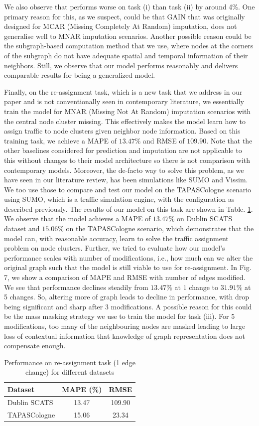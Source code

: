We also observe that \name performs worse on task (i) than task (ii) by around 4\%. One primary reason for this, as we suspect, could be that GAIN that was originally designed for MCAR (Missing Completely At Random) imputation, does not generalise well to MNAR imputation scenarios. Another possible reason could be the subgraph-based computation method that we use, where nodes at the corners of the subgraph do not have adequate spatial and temporal information of their neighbors. Still, we observe that our model performs reasonably and delivers comparable results for being a generalized model.

Finally, on the re-assignment task, which is a new task that we address in our paper and is not conventionally seen in contemporary literature, we essentially train the model for MNAR (Missing Not At Random) imputation scenarios with the central node cluster missing. This effectively makes the model learn how to assign traffic to node clusters given neighbor node information. Based on this training task, we achieve a MAPE of $13.47\%$ and RMSE of $109.90$. Note that the other baselines considered for prediction and imputation are not applicable to this without changes to their model architecture so there is not comparison with contemporary models. Moreover, the de-facto way to solve this problem, as we have seen in our literature review, has been simulations like SUMO\cite{sumo} and Vissim\cite{vissim}. We too use those to compare and test our model on the TAPASCologne scenario using SUMO, which is a traffic simulation engine, with the configuration as described previously. The results of our model on this task are shown in Table. \ref{reassign_table}. We observe that the model achieves a MAPE of $13.47\%$ on Dublin SCATS dataset and $15.06\%$ on the TAPASCologne scenario, which demonstrates that the model can, with reasonable accuracy, learn to solve the traffic assignment problem on node clusters. Further, we tried to evaluate how our model's performance scales with number of modifications, i.e., how much can we alter the original graph such that the model is still viable to use for re-assignment. In Fig. 7, we show a comparison of MAPE and RMSE with number of edges modified. We see that performance declines steadily from $13.47\%$ at $1$ change to $31.91\%$ at 5 changes. So, altering more of graph leads to decline in performance, with drop being significant and sharp after $3$ modifications. A possible reason for this could be the mass masking strategy we use to train the model for task (iii). For 5 modifications, too many of the neighbouring nodes are masked leading to large loss of contextual information that knowledge of graph representation does not compensate enough. 


\begin{table}[]
\centering
\caption{Performance on re-assignment task (1 edge change) for different datasets}
\label{reassign_table}
\begin{tabular}{lcc}
\toprule
Dataset & MAPE (\%) & RMSE \\
\midrule
Dublin SCATS & 13.47 & 109.90 \\
TAPASCologne & 15.06 & 23.34 \\
\bottomrule
\end{tabular}
\end{table}